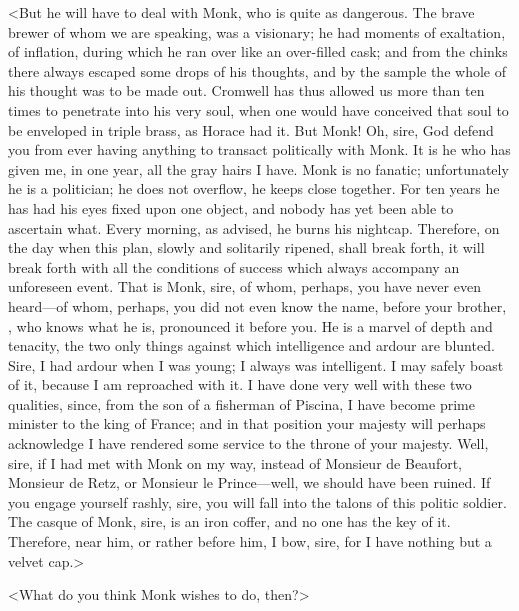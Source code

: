 <But he will have to deal with Monk, who is quite as dangerous. The brave brewer of whom we are speaking, was a visionary; he had moments of exaltation, of inflation, during which he ran over like an over-filled cask; and from the chinks there always escaped some drops of his thoughts, and by the sample the whole of his thought was to be made out. Cromwell has thus allowed us more than ten times to penetrate into his very soul, when one would have conceived that soul to be enveloped in triple brass, as Horace had it. But Monk! Oh, sire, God defend you from ever having anything to transact politically with Monk. It is he who has given me, in one year, all the gray hairs I have. Monk is no fanatic; unfortunately he is a politician; he does not overflow, he keeps close together. For ten years he has had his eyes fixed upon one object, and nobody has yet been able to ascertain what. Every morning, as  advised, he burns his nightcap. Therefore, on the day when this plan, slowly and solitarily ripened, shall break forth, it will break forth with all the conditions of success which always accompany an unforeseen event. That is Monk, sire, of whom, perhaps, you have never even heard—of whom, perhaps, you did not even know the name, before your brother, , who knows what he is, pronounced it before you. He is a marvel of depth and tenacity, the two only things against which intelligence and ardour are blunted. Sire, I had ardour when I was young; I always was intelligent. I may safely boast of it, because I am reproached with it. I have done very well with these two qualities, since, from the son of a fisherman of Piscina, I have become prime minister to the king of France; and in that position your majesty will perhaps acknowledge I have rendered some service to the throne of your majesty. Well, sire, if I had met with Monk on my way, instead of Monsieur de Beaufort, Monsieur de Retz, or Monsieur le Prince—well, we should have been ruined. If you engage yourself rashly, sire, you will fall into the talons of this politic soldier. The casque of Monk, sire, is an iron coffer, and no one has the key of it. Therefore, near him, or rather before him, I bow, sire, for I have nothing but a velvet cap.>

<What do you think Monk wishes to do, then?>

